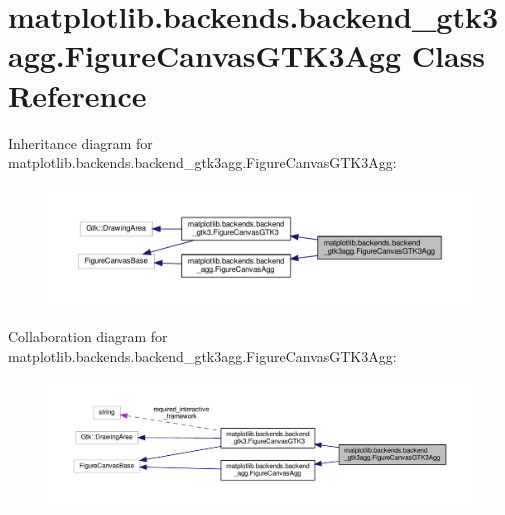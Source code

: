 \hypertarget{classmatplotlib_1_1backends_1_1backend__gtk3agg_1_1FigureCanvasGTK3Agg}{}\section{matplotlib.\+backends.\+backend\+\_\+gtk3agg.\+Figure\+Canvas\+G\+T\+K3\+Agg Class Reference}
\label{classmatplotlib_1_1backends_1_1backend__gtk3agg_1_1FigureCanvasGTK3Agg}


Inheritance diagram for matplotlib.\+backends.\+backend\+\_\+gtk3agg.\+Figure\+Canvas\+G\+T\+K3\+Agg\+:
\nopagebreak
\begin{figure}[H]
\begin{center}
\leavevmode
\includegraphics[width=350pt]{classmatplotlib_1_1backends_1_1backend__gtk3agg_1_1FigureCanvasGTK3Agg__inherit__graph}
\end{center}
\end{figure}


Collaboration diagram for matplotlib.\+backends.\+backend\+\_\+gtk3agg.\+Figure\+Canvas\+G\+T\+K3\+Agg\+:
\nopagebreak
\begin{figure}[H]
\begin{center}
\leavevmode
\includegraphics[width=350pt]{classmatplotlib_1_1backends_1_1backend__gtk3agg_1_1FigureCanvasGTK3Agg__coll__graph}
\end{center}
\end{figure}
